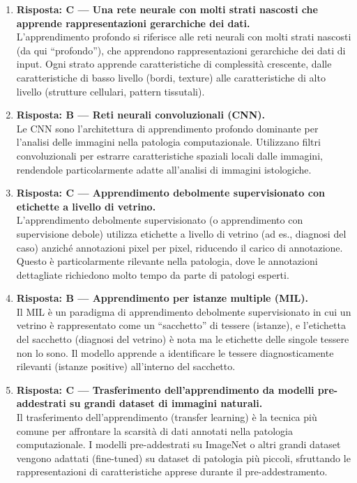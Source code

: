 \begin{enumerate}

    \item \textbf{Risposta: C --- Una rete neurale con molti strati nascosti che apprende
    rappresentazioni gerarchiche dei dati.}\\
    L'apprendimento profondo si riferisce alle reti neurali con molti strati nascosti (da qui
    ``profondo''), che apprendono rappresentazioni gerarchiche dei dati di input. Ogni strato
    apprende caratteristiche di complessità crescente, dalle caratteristiche di basso livello
    (bordi, texture) alle caratteristiche di alto livello (strutture cellulari, pattern tissutali).

    \item \textbf{Risposta: B --- Reti neurali convoluzionali (CNN).}\\
    Le CNN sono l'architettura di apprendimento profondo dominante per l'analisi delle immagini
    nella patologia computazionale. Utilizzano filtri convoluzionali per estrarre caratteristiche
    spaziali locali dalle immagini, rendendole particolarmente adatte all'analisi di immagini
    istologiche.

    \item \textbf{Risposta: C --- Apprendimento debolmente supervisionato con etichette a livello
    di vetrino.}\\
    L'apprendimento debolmente supervisionato (o apprendimento con supervisione debole) utilizza
    etichette a livello di vetrino (ad es., diagnosi del caso) anziché annotazioni pixel per pixel,
    riducendo il carico di annotazione. Questo è particolarmente rilevante nella patologia, dove
    le annotazioni dettagliate richiedono molto tempo da parte di patologi esperti.

    \item \textbf{Risposta: B --- Apprendimento per istanze multiple (MIL).}\\
    Il MIL è un paradigma di apprendimento debolmente supervisionato in cui un vetrino è
    rappresentato come un ``sacchetto'' di tessere (istanze), e l'etichetta del sacchetto (diagnosi
    del vetrino) è nota ma le etichette delle singole tessere non lo sono. Il modello apprende a
    identificare le tessere diagnosticamente rilevanti (istanze positive) all'interno del sacchetto.

    \item \textbf{Risposta: C --- Trasferimento dell'apprendimento da modelli pre-addestrati su
    grandi dataset di immagini naturali.}\\
    Il trasferimento dell'apprendimento (transfer learning) è la tecnica più comune per affrontare
    la scarsità di dati annotati nella patologia computazionale. I modelli pre-addestrati su
    ImageNet o altri grandi dataset vengono adattati (fine-tuned) su dataset di patologia più
    piccoli, sfruttando le rappresentazioni di caratteristiche apprese durante il pre-addestramento.


\end{enumerate}
